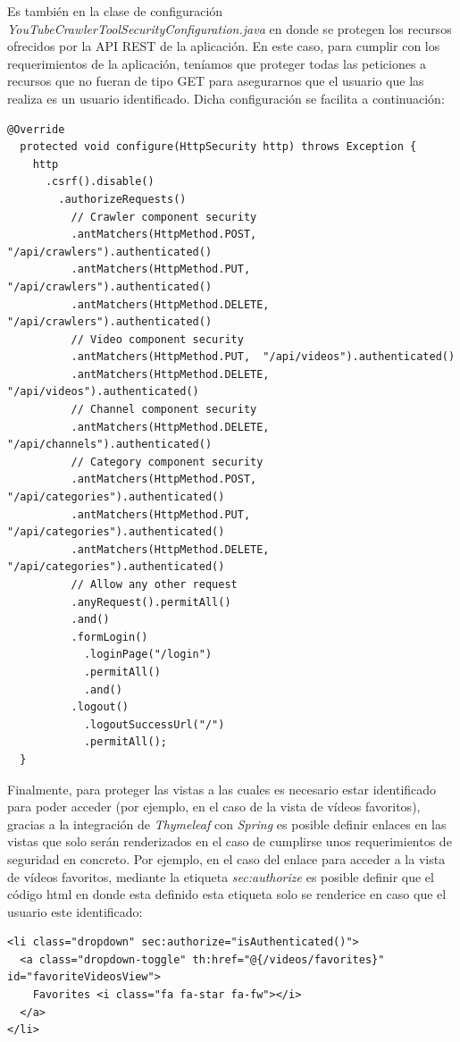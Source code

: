 \documentclass[11pt,a4paper]{article}
\begin{document}
Es también en la clase de configuración \textit{YouTubeCrawlerToolSecurityConfiguration.java} en donde se protegen los recursos ofrecidos por la API REST de la aplicación. En este caso, para cumplir con los requerimientos de la aplicación, teníamos que proteger todas las peticiones a recursos que no fueran de tipo GET para asegurarnos que el usuario que las realiza es un usuario identificado. Dicha configuración se facilita a continuación:
\begin{lstlisting}[style=C]
  @Override
  protected void configure(HttpSecurity http) throws Exception {
    http
      .csrf().disable()
        .authorizeRequests()
          // Crawler component security
          .antMatchers(HttpMethod.POST,	"/api/crawlers").authenticated()
          .antMatchers(HttpMethod.PUT,	"/api/crawlers").authenticated()
          .antMatchers(HttpMethod.DELETE,	"/api/crawlers").authenticated()
          // Video component security
          .antMatchers(HttpMethod.PUT,	"/api/videos").authenticated()
          .antMatchers(HttpMethod.DELETE,	"/api/videos").authenticated()
          // Channel component security
          .antMatchers(HttpMethod.DELETE,	"/api/channels").authenticated()
          // Category component security
          .antMatchers(HttpMethod.POST,	"/api/categories").authenticated()
          .antMatchers(HttpMethod.PUT,	"/api/categories").authenticated()
          .antMatchers(HttpMethod.DELETE,	"/api/categories").authenticated()
          // Allow any other request
          .anyRequest().permitAll()
          .and()
          .formLogin()
            .loginPage("/login")
            .permitAll()
            .and()
          .logout()
            .logoutSuccessUrl("/")
            .permitAll();
  }
\end{lstlisting}

Finalmente, para proteger las vistas a las cuales es necesario estar identificado para poder acceder (por ejemplo, en el caso de la vista de vídeos favoritos), gracias a la integración de \textit{Thymeleaf} con \textit{Spring} es posible definir enlaces en las vistas que solo serán renderizados en el caso de cumplirse unos requerimientos de seguridad en concreto. Por ejemplo, en el caso del enlace para acceder a la vista de vídeos favoritos, mediante la etiqueta \textit{sec:authorize} es posible definir que el código html en donde esta definido esta etiqueta solo se renderice en caso que el usuario este identificado:
\begin{lstlisting}[style=C]
<li class="dropdown" sec:authorize="isAuthenticated()">
  <a class="dropdown-toggle" th:href="@{/videos/favorites}" id="favoriteVideosView">
    Favorites <i class="fa fa-star fa-fw"></i>
  </a>
</li>
\end{lstlisting}
\medskip 
\end{document}

